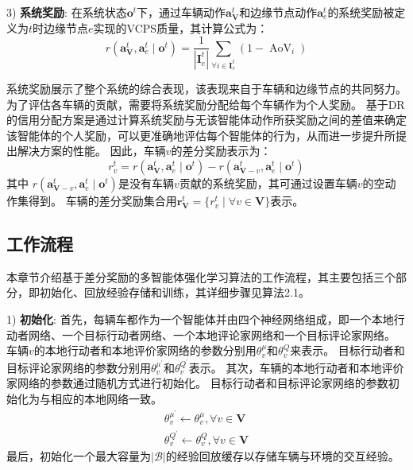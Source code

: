 3) \textbf{系统奖励}: 在系统状态$\boldsymbol{o}^{t}$下，通过车辆动作$\boldsymbol{a}_{\mathbf{V}}^{t}$和边缘节点动作$\boldsymbol{a}_{e}^{t}$的系统奖励被定义为$t$时边缘节点$e$实现的VCPS质量，其计算公式为：
	\begin{equation}
		r\left(\boldsymbol{a}_{\mathbf{V}}^{t},\boldsymbol{a}_{e}^{t} \mid \boldsymbol{o}^{t}\right)=\frac{1}{\left|\mathbf{I}_e^t\right|} \sum_{\forall i \in \mathbf{I}_e^t}\left(1 -\operatorname{AoV}_{i} \right)
	\end{equation}
	
系统奖励展示了整个系统的综合表现，该表现来自于车辆和边缘节点的共同努力。
为了评估各车辆的贡献，需要将系统奖励分配给每个车辆作为个人奖励。
基于DR的信用分配方案是通过计算系统奖励与无该智能体动作所获奖励之间的差值来确定该智能体的个人奖励，可以更准确地评估每个智能体的行为，从而进一步提升所提出解决方案的性能。
因此，车辆$v$的差分奖励表示为：
\begin{equation}
r_{v}^{t}=r\left(\boldsymbol{a}_{\mathbf{V}}^{t},\boldsymbol{a}_{e}^{t} \mid \boldsymbol{o}^{t}\right)-r\left(\boldsymbol{a}_{\mathbf{V}-v}^{t},\boldsymbol{a}_{e}^{t} \mid \boldsymbol{o}^{t}\right)
\end{equation}
\noindent 其中 $r\left(\boldsymbol{a}_{\mathbf{V}-v}^{t},\boldsymbol{a}_{e}^{t} \mid \boldsymbol{o}^{t}\right)$是没有车辆$v$贡献的系统奖励，其可通过设置车辆$v$的空动作集得到。
车辆的差分奖励集合用$\boldsymbol{r}_{\mathbf{V}}^{t}=\{ r_{v}^{t} \mid \forall v \in \mathbf{V}\}$表示。

\subsection{工作流程}
本章节介绍基于差分奖励的多智能体强化学习算法的工作流程，其主要包括三个部分，即初始化、回放经验存储和训练，其详细步骤见算法2.1。

1) \textbf{初始化}: 首先，每辆车都作为一个智能体并由四个神经网络组成，即一个本地行动者网络、一个目标行动者网络、一个本地评论家网络和一个目标评论家网络。
车辆$v$的本地行动者和本地评价家网络的参数分别用$\theta_{v}^{\mu}$和$\theta_{v}^{Q}$来表示。
目标行动者和目标评论家网络的参数分别用$\theta_{v}^{\mu^{\prime}}$和$\theta_{v}^{Q^{\prime}}$表示。
其次，车辆的本地行动者和本地评价家网络的参数通过随机方式进行初始化。
目标行动者和目标评论家网络的参数初始化为与相应的本地网络一致。
\begin{align}
	\theta_{v}^{\mu^{\prime}} \leftarrow \theta_{v}^{\mu}, \forall v \in \mathbf{V}\\
	\theta_{v}^{Q^{\prime}} \leftarrow \theta_{v}^{Q}, \forall v \in \mathbf{V}
\end{align}
最后，初始化一个最大容量为$|\mathcal{B}|$的经验回放缓存以存储车辆与环境的交互经验。


